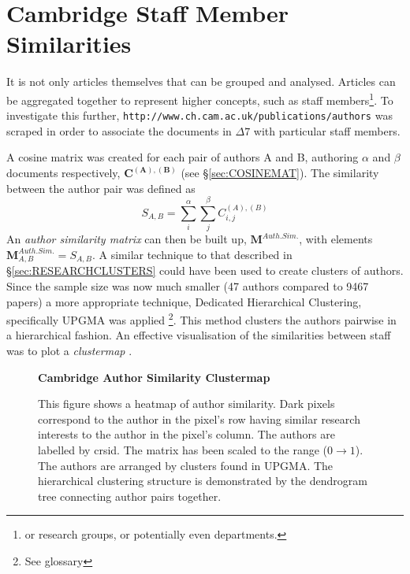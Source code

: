 \section{Cambridge Staff Member Similarities}
\label{sec:AUTHORCLUSTERS}

It is not only articles themselves that can be grouped and analysed. Articles can be aggregated together to represent higher concepts, such as staff members\footnote{or research groups, or potentially even departments. }. To investigate this further, \texttt{http://www.ch.cam.ac.uk/publications/authors} was scraped in order to associate the documents in $\Delta7$ with particular staff members.

A cosine matrix was created for each pair of authors A and B, authoring $\alpha$ and $\beta$ documents respectively, $\mathbf{C^{\left( A \right ) , \left( B \right)}}$ (see \S\ref{sec:COSINEMAT}). The similarity between the author pair was defined as 
$$S_{A , B} = \sum_{i}^{\alpha} \sum_{j}^{\beta} C^{\left( A \right) , \left( B \right) }_{ i , j }$$
An \emph{author similarity matrix} can then be built up, $\mathbf{M}^{Auth. Sim.}$, with elements $\mathbf{M}^{Auth. Sim.}_{ A , B }=S_{ A , B }$.
A similar technique to that described in  \S\ref{sec:RESEARCHCLUSTERS} could have been used to create clusters of authors. Since the sample size was now much smaller (47 authors compared to 9467 papers) a more appropriate technique, Dedicated Hierarchical Clustering, specifically UPGMA was applied \cite{heatmapcluster} \footnote{See glossary}. This method clusters the authors pairwise in a hierarchical fashion.  An effective visualisation of the similarities between staff was to plot a \emph{clustermap} \cite{seaborn} \cite{scipy}.
\begin{center}
\begin{figure}[H]
  \centering
  \textbf{Cambridge Author Similarity Clustermap}
    \caption[Cambrdige Author Similarity Clustermap]{This figure shows a heatmap of author similarity. Dark pixels correspond to the author in the pixel's row having similar research interests to the author in the pixel's column. The authors are labelled by crsid. The matrix has been scaled to the range ($0 \rightarrow 1$).  The authors are arranged by clusters found in UPGMA. The hierarchical clustering structure is demonstrated by the dendrogram tree connecting author pairs together.}
    \label{fig:AUTHORSIMS}

\end{figure} 
\end{center}
